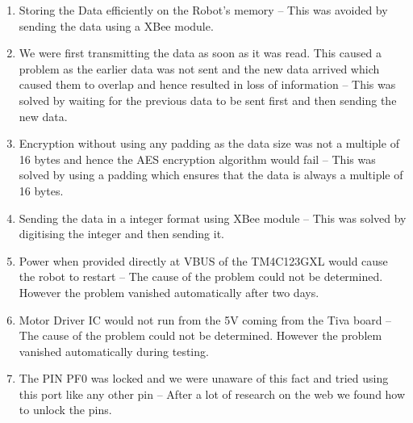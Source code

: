 \documentclass[a4paper,12pt,oneside]{book}
\begin{document}
\begin{enumerate}

\item Storing the Data efficiently on the Robot's memory -- This was avoided by sending the data using a XBee module.
\item We were first transmitting the data as soon as it was read. This caused a problem as the earlier data was not sent and the new data arrived which caused them to overlap and hence resulted in loss of information -- This was solved by waiting for the previous data to be sent first and then sending the new data.
\item Encryption without using any padding as the data size was not a multiple of 16 bytes and hence the AES encryption algorithm would fail -- This was solved by using a padding which ensures that the data is always a multiple of 16 bytes.
\item Sending the data in a integer format using XBee module -- This was solved by digitising the integer and then sending it.
\item Power when provided directly at VBUS of the TM4C123GXL would cause the robot to restart -- The cause of the problem could not be determined. However the problem vanished automatically after two days.
\item Motor Driver IC would not run from the 5V coming from the Tiva board -- The cause of the problem could not be determined. However the problem vanished automatically during testing.
\item The PIN PF0 was locked and we were unaware of this fact and tried using this port like any other pin -- After a lot of research on the web we found how to unlock the pins.

\end{enumerate}
\end{document}
